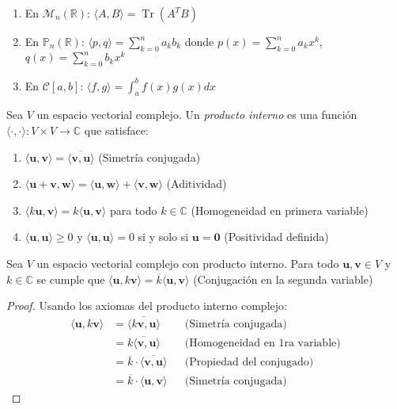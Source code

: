 \begin{rem}
\begin{enumerate}[1.]
    \item En $\mathcal{M}_n(\mathbb{R})$: $\langle A, B \rangle = \operatorname{Tr}(A^T B)$
    \item En $\mathbb{P}_n(\mathbb{R})$: $\langle p, q \rangle = \sum_{k=0}^n a_k b_k$ donde $p(x) = \sum_{k=0}^n a_k x^k$, $q(x) = \sum_{k=0}^n b_k x^k$
    \item En $\mathcal{C}[a,b]$: $\langle f, g \rangle = \int_a^b f(x)g(x)  dx$
\end{enumerate}
\end{rem}

\begin{definition}
Sea $V$ un espacio vectorial complejo. Un \textit{producto interno} es una función $\langle \cdot, \cdot \rangle: V \times V \to \mathbb{C}$ que satisface:
\begin{enumerate}[$1.$]
    \item $\langle \mathbf{u}, \mathbf{v} \rangle = \overline{\langle \mathbf{v}, \mathbf{u} \rangle}$ (Simetría conjugada)
    \item $\langle \mathbf{u} + \mathbf{v}, \mathbf{w} \rangle = \langle \mathbf{u}, \mathbf{w} \rangle + \langle \mathbf{v}, \mathbf{w} \rangle$  (Aditividad)
    \item $\langle k\mathbf{u}, \mathbf{v} \rangle = k\langle \mathbf{u}, \mathbf{v} \rangle$ para todo $k \in \mathbb{C}$ (Homogeneidad en primera variable)
    \item $\langle \mathbf{u}, \mathbf{u} \rangle \geq 0$ y $\langle \mathbf{u}, \mathbf{u} \rangle = 0$ si y solo si $\mathbf{u} = \mathbf{0}$ (Positividad definida)
\end{enumerate}
\end{definition}

\begin{theorem}
Sea $V$ un espacio vectorial complejo con producto interno. Para todo $\mathbf{u}, \mathbf{v} \in V$ y $k \in \mathbb{C}$ se cumple que $\langle \mathbf{u}, k\mathbf{v} \rangle = \overline{k} \langle \mathbf{u}, \mathbf{v} \rangle$ (Conjugación en la segunda variable)
\end{theorem}

\begin{proof} Usando los axiomas del producto interno complejo:
    \begin{align*}
        \langle \mathbf{u}, k\mathbf{v} \rangle 
        &= \overline{\langle k\mathbf{v}, \mathbf{u} \rangle} && \text{(Simetría conjugada)} \\
        &= \overline{k \langle \mathbf{v}, \mathbf{u} \rangle} && \text{(Homogeneidad en 1ra variable)} \\
        &= \overline{k} \cdot \overline{\langle \mathbf{v}, \mathbf{u} \rangle} && \text{(Propiedad del conjugado)} \\
        &= \overline{k} \cdot \langle \mathbf{u}, \mathbf{v} \rangle && \text{(Simetría conjugada)}
    \end{align*}
\end{proof}

